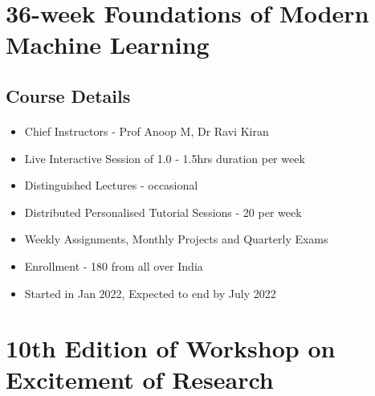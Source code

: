 \section{36-week Foundations of Modern Machine Learning }

\subsection{Course Details}
\begin{frame}[fragile=singleslide]{\insertsectionhead}
  \framesubtitle{\insertsubsectionhead}
\begin{center}
\begin{itemize}
\item Chief Instructors - Prof Anoop M, Dr Ravi Kiran 
\item Live Interactive Session of 1.0 - 1.5hrs duration per week
\item Distinguished Lectures - occasional
\item Distributed Personalised Tutorial Sessions - 20 per week
\item Weekly Assignments, Monthly Projects and Quarterly Exams
\item Enrollment - 180 from all over India
\item Started in Jan 2022, Expected to end by July 2022
\end{itemize}
\end{center}
\end{frame}







\section{10th Edition of Workshop on Excitement of Research}

